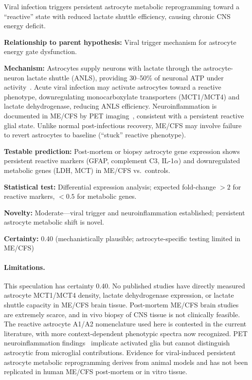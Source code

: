 \begin{speculation}
\label{spec:post-viral-reprogram}
Viral infection triggers persistent astrocyte metabolic reprogramming toward a ``reactive'' state with reduced lactate shuttle efficiency, causing chronic CNS energy deficit.

\textbf{Relationship to parent hypothesis:} Viral trigger mechanism for astrocyte energy gate dysfunction.

\textbf{Mechanism:} Astrocytes supply neurons with lactate through the astrocyte-neuron lactate shuttle (ANLS), providing 30--50\% of neuronal ATP under activity~\cite{Pellerin1994,Magistretti2018}. Acute viral infection may activate astrocytes toward a reactive phenotype, downregulating monocarboxylate transporters (MCT1/MCT4) and lactate dehydrogenase, reducing ANLS efficiency. Neuroinflammation is documented in ME/CFS by PET imaging~\cite{Nakatomi2014neuroinflammation}, consistent with a persistent reactive glial state. Unlike normal post-infectious recovery, ME/CFS may involve failure to revert astrocytes to baseline (``stuck'' reactive phenotype).

\textbf{Testable prediction:} Post-mortem or biopsy astrocyte gene expression shows persistent reactive markers (GFAP, complement C3, IL-1$\alpha$) and downregulated metabolic genes (LDH, MCT) in ME/CFS vs.\ controls.

\textbf{Statistical test:} Differential expression analysis; expected fold-change $> 2$ for reactive markers, $< 0.5$ for metabolic genes.

\textbf{Novelty:} Moderate---viral trigger and neuroinflammation established; persistent astrocyte metabolic shift is novel.

\textbf{Certainty:} 0.40 (mechanistically plausible; astrocyte-specific testing limited in ME/CFS)

\paragraph{Limitations.}
This speculation has certainty 0.40. No published studies have directly measured astrocyte MCT1/MCT4 density, lactate dehydrogenase expression, or lactate shuttle capacity in ME/CFS brain tissue. Post-mortem ME/CFS brain studies are extremely scarce, and in vivo biopsy of CNS tissue is not clinically feasible. The reactive astrocyte A1/A2 nomenclature used here is contested in the current literature, with more context-dependent phenotypic spectra now recognized. PET neuroinflammation findings~\cite{Nakatomi2014neuroinflammation} implicate activated glia but cannot distinguish astrocytic from microglial contributions. Evidence for viral-induced persistent astrocyte metabolic reprogramming derives from animal models and has not been replicated in human ME/CFS post-mortem or in vitro tissue.
\end{speculation}

